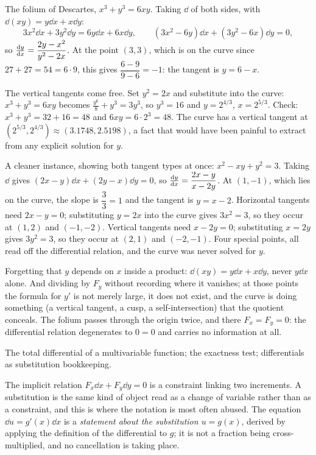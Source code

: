 \begin{worked}
The folium of Descartes, $x^{3}+y^{3}=6xy$. Taking $\dd$ of both sides, with $\dd(xy)=y\dd x+x\dd y$:
\[3x^{2}\dd x+3y^{2}\dd y=6y\dd x+6x\dd y,\qquad (3x^{2}-6y)\dd x+(3y^{2}-6x)\dd y=0,\]
so $\frac{\mathrm{d}y}{\mathrm{d}x}=\dfrac{2y-x^{2}}{y^{2}-2x}$. At the point $(3,3)$, which is on the curve since $27+27=54=6\cdot9$, this gives $\dfrac{6-9}{9-6}=-1$: the tangent is $y=6-x$.

The vertical tangents come free. Set $y^{2}=2x$ and substitute into the curve: $x^{3}+y^{3}=6xy$ becomes $\tfrac{y^{6}}{8}+y^{3}=3y^{3}$, so $y^{3}=16$ and $y=2^{4/3}$, $x=2^{5/3}$. Check: $x^{3}+y^{3}=32+16=48$ and $6xy=6\cdot2^{3}=48$. The curve has a vertical tangent at $(2^{5/3},2^{4/3})\approx(3.1748,2.5198)$, a fact that would have been painful to extract from any explicit solution for $y$.

A cleaner instance, showing both tangent types at once: $x^{2}-xy+y^{2}=3$. Taking $\dd$ gives $(2x-y)\dd x+(2y-x)\dd y=0$, so $\frac{\mathrm{d}y}{\mathrm{d}x}=\dfrac{2x-y}{x-2y}$. At $(1,-1)$, which lies on the curve, the slope is $\dfrac{3}{3}=1$ and the tangent is $y=x-2$. Horizontal tangents need $2x-y=0$; substituting $y=2x$ into the curve gives $3x^{2}=3$, so they occur at $(1,2)$ and $(-1,-2)$. Vertical tangents need $x-2y=0$; substituting $x=2y$ gives $3y^{2}=3$, so they occur at $(2,1)$ and $(-2,-1)$. Four special points, all read off the differential relation, and the curve was never solved for $y$.
\end{worked}

\begin{trap}
Forgetting that $y$ depends on $x$ inside a product: $\dd(xy)=y\dd x+x\dd y$, never $y\dd x$ alone. And dividing by $F_y$ without recording where it vanishes; at those points the formula for $y'$ is not merely large, it does not exist, and the curve is doing something (a vertical tangent, a cusp, a self-intersection) that the quotient conceals. The folium passes through the origin twice, and there $F_x=F_y=0$: the differential relation degenerates to $0=0$ and carries no information at all.
\end{trap}

\begin{seealsob}The total differential of a multivariable function; the exactness test; differentials as substitution bookkeeping.\end{seealsob}

The implicit relation $F_x\dd x+F_y\dd y=0$ is a constraint linking two increments. A substitution is the same kind of object read as a change of variable rather than as a constraint, and this is where the notation is most often abused. The equation $\dd u=g'(x)\dd x$ is a \emph{statement about the substitution $u=g(x)$}, derived by applying the definition of the differential to $g$; it is not a fraction being cross-multiplied, and no cancellation is taking place.

